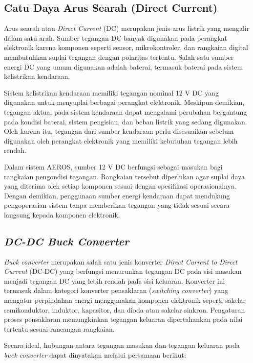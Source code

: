 \subsection{Catu Daya Arus Searah (Direct Current)}
\label{subsec:Catu_Daya_DC}

Arus searah atau \textit{Direct Current} (DC) merupakan jenis arus listrik yang mengalir dalam satu arah. Sumber tegangan DC banyak digunakan pada perangkat elektronik karena komponen seperti sensor, mikrokontroler, dan rangkaian digital membutuhkan suplai tegangan dengan polaritas tertentu. Salah satu sumber energi DC yang umum digunakan adalah baterai, termasuk baterai pada sistem kelistrikan kendaraan.

Sistem kelistrikan kendaraan memiliki tegangan nominal 12 V DC yang digunakan untuk menyuplai berbagai perangkat elektronik. Meskipun demikian, tegangan aktual pada sistem kendaraan dapat mengalami perubahan bergantung pada kondisi baterai, sistem pengisian, dan beban listrik yang sedang digunakan. Oleh karena itu, tegangan dari sumber kendaraan perlu disesuaikan sebelum digunakan oleh perangkat elektronik yang memiliki kebutuhan tegangan lebih rendah.

Dalam sistem AEROS, sumber 12 V DC berfungsi sebagai masukan bagi rangkaian pengondisi tegangan. Rangkaian tersebut diperlukan agar suplai daya yang diterima oleh setiap komponen sesuai dengan spesifikasi operasionalnya. Dengan demikian, penggunaan sumber energi kendaraan dapat mendukung pengoperasian sistem tanpa memberikan tegangan yang tidak sesuai secara langsung kepada komponen elektronik.

\subsection{\textit{DC-DC Buck Converter}}
\label{subsec:Buck_Converter}

\textit{Buck converter} merupakan salah satu jenis konverter \textit{Direct Current to Direct Current} (DC-DC) yang berfungsi menurunkan tegangan DC pada sisi masukan menjadi tegangan DC yang lebih rendah pada sisi keluaran. Konverter ini termasuk dalam kategori konverter pensaklaran (\textit{switching converter}) yang mengatur perpindahan energi menggunakan komponen elektronik seperti sakelar semikonduktor, induktor, kapasitor, dan dioda atau sakelar sinkron. Pengaturan proses pensaklaran memungkinkan tegangan keluaran dipertahankan pada nilai tertentu sesuai rancangan rangkaian.

Secara ideal, hubungan antara tegangan masukan dan tegangan keluaran pada \textit{buck converter} dapat dinyatakan melalui persamaan berikut:

